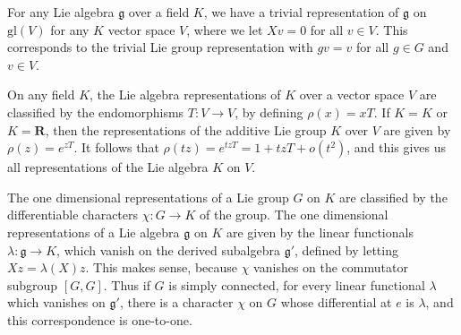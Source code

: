 \begin{example}
    For any Lie algebra $\mathfrak{g}$ over a field $K$, we have a trivial representation of $\mathfrak{g}$ on $\text{gl}(V)$ for any $K$ vector space $V$, where we let $Xv = 0$ for all $v \in V$. This corresponds to the trivial Lie group representation with $gv = v$ for all $g \in G$ and $v \in V$.
\end{example}

\begin{example}
    On any field $K$, the Lie algebra representations of $K$ over a vector space $V$ are classified by the endomorphisms $T: V \to V$, by defining $\rho(x) = xT$. If $K = K$ or $K = \mathbf{R}$, then the representations of the additive Lie group $K$ over $V$ are given by $\rho(z) = e^{zT}$. It follows that $\rho(tz) = e^{tzT} = 1 + tzT + o(t^2)$, and this gives us all representations of the Lie algebra $K$ on $V$.
\end{example}

\begin{example}
    The one dimensional representations of a Lie group $G$ on $K$ are classified by the differentiable characters $\chi: G \to K$ of the group. The one dimensional representations of a Lie algebra $\mathfrak{g}$ on $K$ are given by the linear functionals $\lambda: \mathfrak{g} \to K$, which vanish on the derived subalgebra $\mathfrak{g}'$, defined by letting $Xz = \lambda(X)z$. This makes sense, because $\chi$ vanishes on the commutator subgroup $[G,G]$. Thus if $G$ is simply connected, for every linear functional $\lambda$ which vanishes on $\mathfrak{g}'$, there is a character $\chi$ on $G$ whose differential at $e$ is $\lambda$, and this correspondence is one-to-one.
\end{example}

